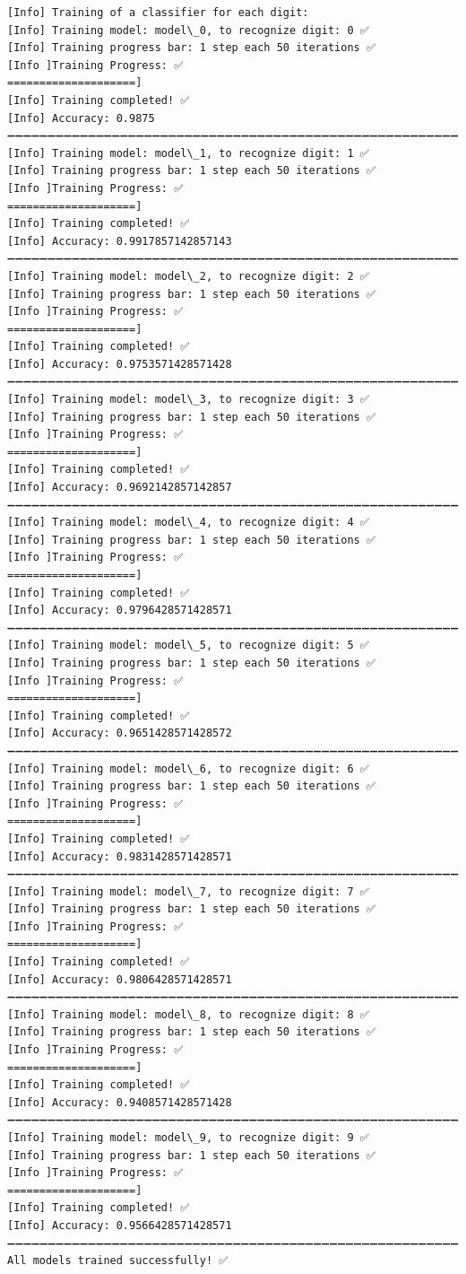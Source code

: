 \documentclass[11pt]{article}
\begin{document}
    \begin{Verbatim}[commandchars=\\\{\}]
[Info] Training of a classifier for each digit:
[Info] Training model: model\_0, to recognize digit: 0 ✅
[Info] Training progress bar: 1 step each 50 iterations ✅
[Info ]Training Progress: ✅
====================]
[Info] Training completed! ✅
[Info] Accuracy: 0.9875
➖➖➖➖➖➖➖➖➖➖➖➖➖➖➖➖➖➖➖➖➖➖➖➖➖➖➖➖➖➖➖➖➖➖➖➖➖➖➖➖➖➖➖➖➖➖➖➖➖➖➖➖➖➖➖➖➖➖➖➖
[Info] Training model: model\_1, to recognize digit: 1 ✅
[Info] Training progress bar: 1 step each 50 iterations ✅
[Info ]Training Progress: ✅
====================]
[Info] Training completed! ✅
[Info] Accuracy: 0.9917857142857143
➖➖➖➖➖➖➖➖➖➖➖➖➖➖➖➖➖➖➖➖➖➖➖➖➖➖➖➖➖➖➖➖➖➖➖➖➖➖➖➖➖➖➖➖➖➖➖➖➖➖➖➖➖➖➖➖➖➖➖➖
[Info] Training model: model\_2, to recognize digit: 2 ✅
[Info] Training progress bar: 1 step each 50 iterations ✅
[Info ]Training Progress: ✅
====================]
[Info] Training completed! ✅
[Info] Accuracy: 0.9753571428571428
➖➖➖➖➖➖➖➖➖➖➖➖➖➖➖➖➖➖➖➖➖➖➖➖➖➖➖➖➖➖➖➖➖➖➖➖➖➖➖➖➖➖➖➖➖➖➖➖➖➖➖➖➖➖➖➖➖➖➖➖
[Info] Training model: model\_3, to recognize digit: 3 ✅
[Info] Training progress bar: 1 step each 50 iterations ✅
[Info ]Training Progress: ✅
====================]
[Info] Training completed! ✅
[Info] Accuracy: 0.9692142857142857
➖➖➖➖➖➖➖➖➖➖➖➖➖➖➖➖➖➖➖➖➖➖➖➖➖➖➖➖➖➖➖➖➖➖➖➖➖➖➖➖➖➖➖➖➖➖➖➖➖➖➖➖➖➖➖➖➖➖➖➖
[Info] Training model: model\_4, to recognize digit: 4 ✅
[Info] Training progress bar: 1 step each 50 iterations ✅
[Info ]Training Progress: ✅
====================]
[Info] Training completed! ✅
[Info] Accuracy: 0.9796428571428571
➖➖➖➖➖➖➖➖➖➖➖➖➖➖➖➖➖➖➖➖➖➖➖➖➖➖➖➖➖➖➖➖➖➖➖➖➖➖➖➖➖➖➖➖➖➖➖➖➖➖➖➖➖➖➖➖➖➖➖➖
[Info] Training model: model\_5, to recognize digit: 5 ✅
[Info] Training progress bar: 1 step each 50 iterations ✅
[Info ]Training Progress: ✅
====================]
[Info] Training completed! ✅
[Info] Accuracy: 0.9651428571428572
➖➖➖➖➖➖➖➖➖➖➖➖➖➖➖➖➖➖➖➖➖➖➖➖➖➖➖➖➖➖➖➖➖➖➖➖➖➖➖➖➖➖➖➖➖➖➖➖➖➖➖➖➖➖➖➖➖➖➖➖
[Info] Training model: model\_6, to recognize digit: 6 ✅
[Info] Training progress bar: 1 step each 50 iterations ✅
[Info ]Training Progress: ✅
====================]
[Info] Training completed! ✅
[Info] Accuracy: 0.9831428571428571
➖➖➖➖➖➖➖➖➖➖➖➖➖➖➖➖➖➖➖➖➖➖➖➖➖➖➖➖➖➖➖➖➖➖➖➖➖➖➖➖➖➖➖➖➖➖➖➖➖➖➖➖➖➖➖➖➖➖➖➖
[Info] Training model: model\_7, to recognize digit: 7 ✅
[Info] Training progress bar: 1 step each 50 iterations ✅
[Info ]Training Progress: ✅
====================]
[Info] Training completed! ✅
[Info] Accuracy: 0.9806428571428571
➖➖➖➖➖➖➖➖➖➖➖➖➖➖➖➖➖➖➖➖➖➖➖➖➖➖➖➖➖➖➖➖➖➖➖➖➖➖➖➖➖➖➖➖➖➖➖➖➖➖➖➖➖➖➖➖➖➖➖➖
[Info] Training model: model\_8, to recognize digit: 8 ✅
[Info] Training progress bar: 1 step each 50 iterations ✅
[Info ]Training Progress: ✅
====================]
[Info] Training completed! ✅
[Info] Accuracy: 0.9408571428571428
➖➖➖➖➖➖➖➖➖➖➖➖➖➖➖➖➖➖➖➖➖➖➖➖➖➖➖➖➖➖➖➖➖➖➖➖➖➖➖➖➖➖➖➖➖➖➖➖➖➖➖➖➖➖➖➖➖➖➖➖
[Info] Training model: model\_9, to recognize digit: 9 ✅
[Info] Training progress bar: 1 step each 50 iterations ✅
[Info ]Training Progress: ✅
====================]
[Info] Training completed! ✅
[Info] Accuracy: 0.9566428571428571
➖➖➖➖➖➖➖➖➖➖➖➖➖➖➖➖➖➖➖➖➖➖➖➖➖➖➖➖➖➖➖➖➖➖➖➖➖➖➖➖➖➖➖➖➖➖➖➖➖➖➖➖➖➖➖➖➖➖➖➖
All models trained successfully! ✅
    \end{Verbatim}
\end{document}
